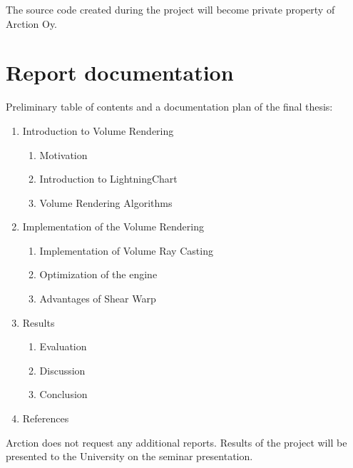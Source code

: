\documentclass[english]{article}
\begin{document}
The source code created during the project will become private property of Arction Oy.

\section{Report documentation}
Preliminary table of contents and a documentation plan of the final thesis:
\begin{enumerate}
\item Introduction to Volume Rendering 
\begin{enumerate}[label*=\arabic*] 
\item Motivation \item Introduction to LightningChart 
\item Volume Rendering Algorithms
 \end{enumerate}
\item Implementation of the Volume Rendering 
\begin{enumerate}[label*=\arabic*] 
\item Implementation of Volume Ray Casting 
\item Optimization of the engine 
\item Advantages of Shear Warp 
\end{enumerate}
\item Results
 \begin{enumerate}[label*=\arabic*] 
\item Evaluation 
\item Discussion 
\item Conclusion 
\end{enumerate}
\item References
\end{enumerate}

Arction does not request any additional reports. Results of the project will be presented to the University on the seminar presentation.
\end{document}

